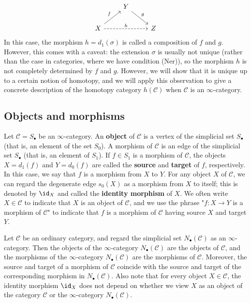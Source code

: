 \[\begin{tikzcd}
&Y\ar[rd,"g"]&\\
X\ar[ru,"f"]\ar[rr,dashed,"h"]&&Z
\end{tikzcd}\]
In this case, the morphism $h=d_1(\sigma)$ is called a composition of $f$ and $g$. However, this comes with a caveat: the extension $\sigma$ is usually not unique (rather than the case in categories, where we have condition (Ner)), so the morphism $h$ is not completely determined by $f$ and $g$. However, we will show that it is unique up to a certain notion of homotopy, and we will apply this observation to give a concrete description of the homotopy category $h(\mathcal{C})$ when $\mathcal{C}$ is an $\infty$-category.
\subsection{Objects and morphisms}
Let $\mathcal{C}=S_\bullet$ be an $\infty$-category. An \textbf{object} of $\mathcal{C}$ is a vertex of the simplicial set $S_\bullet$ (that is, an element of the set $S_0$). A morphism of $\mathcal{C}$ is an edge of the simplicial set $S_\bullet$ (that is, an element of $S_1$). If $f\in S_1$ is a morphism of $\mathcal{C}$, the objects $X=d_1(f)$ and $Y=d_0(f)$ are called the \textbf{source} and \textbf{target} of $f$, respectively. In this case, we say that $f$ is a morphism from $X$ to $Y$. For any object $X$ of $\mathcal{C}$, we can regard the degenerate edge $s_0(X)$ as a morphism from $X$ to itself; this is denoted by $\id_X$ and called the \textbf{identity morphism} of $X$. We often write $X\in\mathcal{C}$ to indicate that $X$ is an object of $\mathcal{C}$, and we use the phrase "$f:X\to Y$ is a morphism of $\mathcal{C}$" to indicate that $f$ is a morphism of $\mathcal{C}$ having source $X$ and target $Y$.
\begin{example}
Let $\mathcal{C}$ be an ordinary category, and regard the simplicial set $N_\bullet(\mathcal{C})$ as an $\infty$-category. Then the objects of the $\infty$-category $N_\bullet(\mathcal{C})$ are the objects of $\mathcal{C}$, and the morphisms of the $\infty$-category $N_\bullet(\mathcal{C})$ are the morphisms of $\mathcal{C}$. Moreover, the source and target of a morphism of $\mathcal{C}$ coincide with the source and target of the corresponding morphism in $N_\bullet(\mathcal{C})$. Also note that for every object $X\in\mathcal{C}$, the identity morphism $\id_X$ does not depend on whether we view $X$ as an object of the category $\mathcal{C}$ or the $\infty$-category $N_\bullet(\mathcal{C})$.
\end{example}
